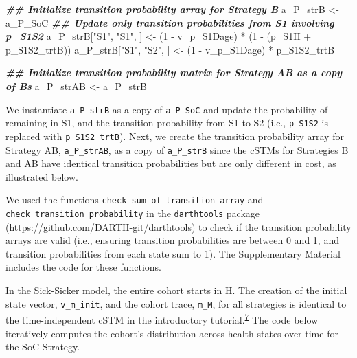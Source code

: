 \documentclass[
]{article}
\newenvironment{Shaded}{\begin{snugshade}}{\end{snugshade}}
\newcommand{\DecValTok}[1]{\textcolor[rgb]{0.00,0.00,0.81}{#1}}
\newcommand{\DocumentationTok}[1]{\textcolor[rgb]{0.56,0.35,0.01}{\textbf{\textit{#1}}}}
\newcommand{\NormalTok}[1]{#1}
\newcommand{\OtherTok}[1]{\textcolor[rgb]{0.56,0.35,0.01}{#1}}
\newcommand{\SpecialCharTok}[1]{\textcolor[rgb]{0.00,0.00,0.00}{#1}}
\newcommand{\StringTok}[1]{\textcolor[rgb]{0.31,0.60,0.02}{#1}}
\begin{document}
\begin{Shaded}
\begin{Highlighting}[]
\DocumentationTok{\#\# Initialize transition probability array for Strategy B}
\NormalTok{a\_P\_strB }\OtherTok{\textless{}{-}}\NormalTok{ a\_P\_SoC}
\DocumentationTok{\#\# Update only transition probabilities from S1 involving p\_S1S2}
\NormalTok{a\_P\_strB[}\StringTok{"S1"}\NormalTok{, }\StringTok{"S1"}\NormalTok{, ] }\OtherTok{\textless{}{-}}\NormalTok{ (}\DecValTok{1} \SpecialCharTok{{-}}\NormalTok{ v\_p\_S1Dage) }\SpecialCharTok{*}\NormalTok{ (}\DecValTok{1} \SpecialCharTok{{-}}\NormalTok{ (p\_S1H }\SpecialCharTok{+}\NormalTok{ p\_S1S2\_trtB))}
\NormalTok{a\_P\_strB[}\StringTok{"S1"}\NormalTok{, }\StringTok{"S2"}\NormalTok{, ] }\OtherTok{\textless{}{-}}\NormalTok{ (}\DecValTok{1} \SpecialCharTok{{-}}\NormalTok{ v\_p\_S1Dage) }\SpecialCharTok{*}\NormalTok{ p\_S1S2\_trtB}

\DocumentationTok{\#\# Initialize transition probability matrix for Strategy AB as a copy of B\textquotesingle{}s}
\NormalTok{a\_P\_strAB }\OtherTok{\textless{}{-}}\NormalTok{ a\_P\_strB}
\end{Highlighting}
\end{Shaded}

We instantiate \texttt{a\_P\_strB} as a copy of \texttt{a\_P\_SoC} and update the probability of remaining in S1, and the transition probability from S1 to S2 (i.e., \texttt{p\_S1S2} is replaced with \texttt{p\_S1S2\_trtB}). Next, we create the transition probability array for Strategy AB, \texttt{a\_P\_strAB}, as a copy of \texttt{a\_P\_strB} since the cSTMs for Strategies B and AB have identical transition probabilities but are only different in cost, as illustrated below.

We used the functions \texttt{check\_sum\_of\_transition\_array} and \texttt{check\_transition\_probability} in the \texttt{darthtools} package (\url{https://github.com/DARTH-git/darthtools}) to check if the transition probability arrays are valid (i.e., ensuring transition probabilities are between 0 and 1, and transition probabilities from each state sum to 1). The Supplementary Material includes the code for these functions.

In the Sick-Sicker model, the entire cohort starts in H. The creation of the initial state vector, \texttt{v\_m\_init}, and the cohort trace, \texttt{m\_M}, for all strategies is identical to the time-independent cSTM in the introductory tutorial.\textsuperscript{\protect\hyperlink{ref-Alarid-Escudero2022b}{7}} The code below iteratively computes the cohort's distribution across health states over time for the SoC Strategy.
\end{document}
